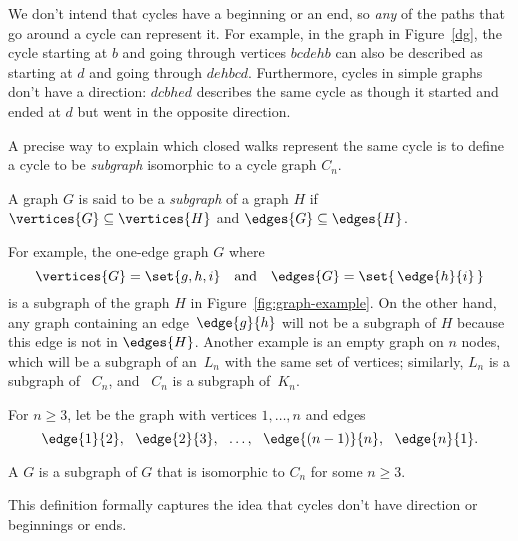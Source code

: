 We don't intend that cycles have a beginning or an end, so \emph{any}
of the paths that go around a cycle can represent it.  For example, in
the graph in Figure~\ref{dg}, the cycle starting at $b$ and going
through vertices $bcdehb$ can also be described as starting at $d$ and
going through $dehbcd$.  Furthermore, cycles in simple graphs don't
have a direction: $dcbhed$ describes the same cycle as though it
started and ended at $d$ but went in the opposite direction.

A precise way to explain which closed walks represent the same cycle
is to define a cycle to be \emph{subgraph} isomorphic to a cycle graph
$C_n$.

\begin{definition}\label{def:subgraph}
  A graph $G$ is said to be a \emph{subgraph} of a graph $H$ if
  $\vertices{G} \subseteq \vertices{H}$ and $\edges{G} \subseteq
  \edges{H}$.
\end{definition}

For example, the one-edge graph $G$ where
\begin{equation*}
   \vertices{G} = \set{ g, h, i } \quad \text{and}\quad  \edges{G} =
   \set{\, \edge{h}{i} \, }
\end{equation*}
is a subgraph of the graph $H$ in Figure~\ref{fig:graph-example}.  On the
other hand, any graph containing an edge~$\edge{g}{h}$ will not be a
subgraph of $H$ because this edge is not in $\edges{H}$.  Another example
is an empty graph on $n$ nodes, which will be a subgraph of an~$L_n$ with
the same set of vertices; similarly, $L_n$ is a subgraph of ~$C_n$, and ~$C_n$ is
a subgraph of~$K_n$.

\begin{definition}
  For $n \ge 3$, let  be the graph with vertices $1,\dots, n$
  and edges
\[
\edge{1}{2},\ \ \edge{2}{3},\ \ \dots,\ \ \edge{(n-1)}{n},\ \ \edge{n}{1}.
\]

\iffalse
A graph is a \term{cycle} of length $n$ iff it is isomorphic to $C_n$
for some $n \ge 3$.
\fi

A  $G$ is a subgraph of $G$ that is
isomorphic to $C_n$ for some $n \ge 3$.
\end{definition}

This definition formally captures the idea that cycles don't
have direction or beginnings or ends.

\begin{problems}
\examproblems
{}

\homeworkproblems
{}
\end{problems}

